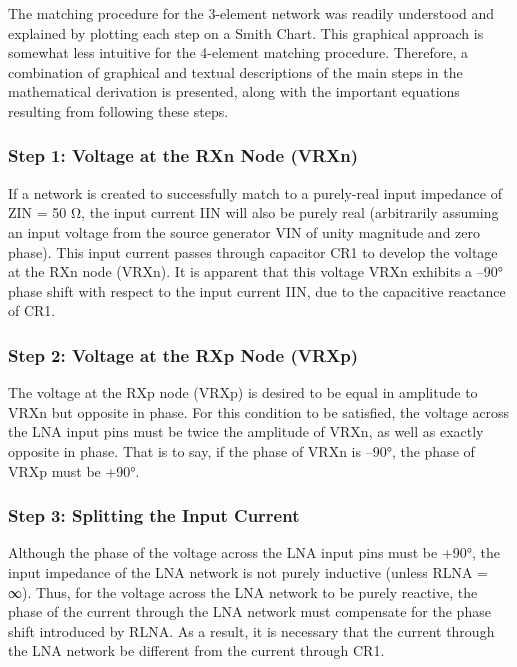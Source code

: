         The matching procedure for the 3-element network was readily understood and explained by plotting 
        each step on a Smith Chart. This graphical approach is somewhat less intuitive for the 4-element 
        matching procedure. Therefore, a combination of graphical and textual descriptions of the main steps 
        in the mathematical derivation is presented, along with the important equations resulting from 
        following these steps.
       
      \subsubsection{Step 1: Voltage at the RXn Node (VRXn)}
        If a network is created to successfully match to a purely-real input impedance of ZIN = 50 Ω, the 
        input current IIN will also be purely real (arbitrarily assuming an input voltage from the source 
        generator VIN of unity magnitude and zero phase). This input current passes through capacitor CR1 to 
        develop the voltage at the RXn node (VRXn). It is apparent that this voltage VRXn exhibits a –90° 
        phase shift with respect to the input current IIN, due to the capacitive reactance of CR1.
        
      \subsubsection{Step 2: Voltage at the RXp Node (VRXp)}
        The voltage at the RXp node (VRXp) is desired to be equal in amplitude to VRXn but opposite in phase. 
        For this condition to be satisfied, the voltage across the LNA input pins must be twice the amplitude 
        of VRXn, as well as exactly opposite in phase. That is to say, if the phase of VRXn is –90°, the 
        phase of VRXp must be +90°.
        
      \subsubsection{Step 3: Splitting the Input Current}
        Although the phase of the voltage across the LNA input pins must be +90°, the input impedance of the 
        LNA network is not purely inductive (unless RLNA = ∞). Thus, for the voltage across the LNA network 
        to be purely reactive, the phase of the current through the LNA network must compensate for the phase 
        shift introduced by RLNA. As a result, it is necessary that the current through the LNA network be 
        different from the current through CR1.
        
